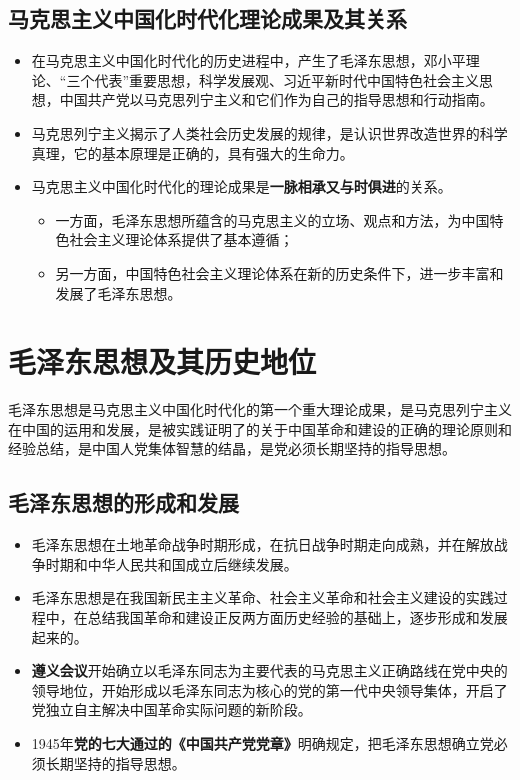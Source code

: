 \documentclass[12pt,openany]{ctexbook}
\begin{document}
\section{马克思主义中国化时代化理论成果及其关系}
\begin{itemize}
  \item 在马克思主义中国化时代化的历史进程中，产生了毛泽东思想，邓小平理论、“三个代表”重要思想，科学发展观、习近平新时代中国特色社会主义思想，中国共产党以马克思列宁主义和它们作为自己的指导思想和行动指南。
  \item 马克思列宁主义揭示了人类社会历史发展的规律，是认识世界改造世界的科学真理，它的基本原理是正确的，具有强大的生命力。
  \item 马克思主义中国化时代化的理论成果是\textbf{一脉相承又与时俱进}的关系。
\begin{itemize}
  \item 一方面，毛泽东思想所蕴含的马克思主义的立场、观点和方法，为中国特色社会主义理论体系提供了基本遵循；
  \item 另一方面，中国特色社会主义理论体系在新的历史条件下，进一步丰富和发展了毛泽东思想。
\end{itemize}
\end{itemize}
\chapter{毛泽东思想及其历史地位}
毛泽东思想是马克思主义中国化时代化的第一个重大理论成果，是马克思列宁主义在中国的运用和发展，是被实践证明了的关于中国革命和建设的正确的理论原则和经验总结，是中国人党集体智慧的结晶，是党必须长期坚持的指导思想。
\section{毛泽东思想的形成和发展}
\begin{itemize}
  \item 毛泽东思想在土地革命战争时期形成，在抗日战争时期走向成熟，并在解放战争时期和中华人民共和国成立后继续发展。
  \item 毛泽东思想是在我国新民主主义革命、社会主义革命和社会主义建设的实践过程中，在总结我国革命和建设正反两方面历史经验的基础上，逐步形成和发展起来的。
  \item \textbf{遵义会议}开始确立以毛泽东同志为主要代表的马克思主义正确路线在党中央的领导地位，开始形成以毛泽东同志为核心的党的第一代中央领导集体，开启了党独立自主解决中国革命实际问题的新阶段。
  \item 1945年\textbf{党的七大通过的《中国共产党党章》}明确规定，把毛泽东思想确立党必须长期坚持的指导思想。
\end{itemize}
\end{document}
